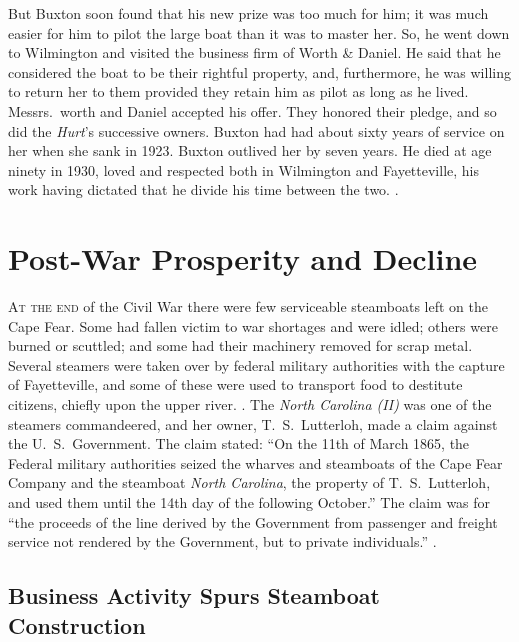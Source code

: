 \documentclass[11pt, a5paper, openright]{book}
\newcommand{\steamer}[1]{\textit{#1}\index{#1,~steamer}}
\newcommand{\steamerco}[1]{#1\index{#1}}
\begin{document}
But Buxton soon found that his new prize was too much for him; it was
much easier for him to pilot the large boat than it was to master her.
So, he went down to Wilmington and visited the business firm of Worth
\& Daniel.  He said that he considered the boat to be their rightful
property, and, furthermore, he was willing to return her to them
provided they retain him as pilot as long as he lived.  Messrs.\ worth
and Daniel accepted his offer.  They honored their pledge, and so did
the \textit{Hurt}'s successive owners.  Buxton had had about sixty
years of service on her when she sank in 1923.  Buxton outlived her by
seven years.  He died at age ninety in 1930, loved and respected both
in Wilmington and Fayetteville, his work having dictated that he
divide his time between the two.  \citep[6-12-1934]{wn}.\par

\chapter{Post-War Prosperity and Decline}

\textsc{At the end} of the Civil War there were few serviceable
steamboats left on the Cape Fear.  Some had fallen victim to war
shortages and were idled; others were burned or scuttled; and some had
their machinery removed for scrap metal.  Several steamers were taken
over by federal military authorities with the capture of Fayetteville,
and some of these were used to transport food to destitute citizens,
chiefly upon the upper river.  \citep[55]{sloanth}.  The
\steamer{North Carolina (II)} was one of the steamers commandeered,
and her owner, T.~S.~Lutterloh, made a
claim against the U.~S.~Government.
The claim stated: ``On the 11th of March 1865, the Federal military
authorities seized the wharves and steamboats of the
\steamerco{Cape Fear Company} and the steamboat
\textit{North Carolina}, the property of T.~S.~Lutterloh,
and used them until the 14th day of the following October.''  The
claim was for ``the proceeds of the line derived by the Government
from passenger and freight service not rendered by the Government, but
to private individuals.''  \citep[4-6-1894]{ws}.\par

\section[New Steamboat Construction]{Business Activity Spurs Steamboat Construction}
\end{document}
